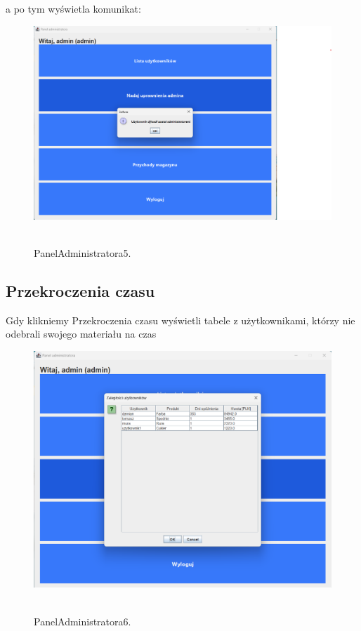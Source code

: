 a po tym wyświetla komunikat:

\begin{figure}[H]
    \centering
    \includegraphics[width=.9\linewidth]{figures/PanelAdministratora5.png}\
    \caption{PanelAdministratora5.\label{PanelAdministratora5}}
\end{figure}

\subsection{Przekroczenia czasu}
\label{subsec:Przekroczenia czasu}

Gdy klikniemy Przekroczenia czasu wyświetli tabele z użytkownikami, którzy nie odebrali swojego materiału na czas

\begin{figure}[H]
    \centering
    \includegraphics[width=.9\linewidth]{figures/PanelAdministratora6.png}\
    \caption{PanelAdministratora6.\label{PanelAdministratora6}}
\end{figure}

